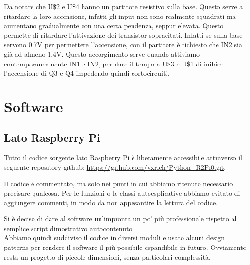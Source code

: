 \documentclass[12pt]{article}
\begin{document}
Da notare che U\$2 e U\$4 hanno un partitore resistivo sulla base. Questo serve a ritardare la loro accensione, infatti gli input non sono realmente squadrati ma aumentano gradualmente con una certa pendenza, seppur elevata. Questo permette di ritardare l'attivazione dei transistor sopracitati. Infatti se sulla base servono 0.7V per permettere l'accensione, con il partitore è richiesto che IN2 sia già ad almeno 1.4V. Questo accorgimento serve quando attiviamo contemporaneamente IN1 e IN2, per dare il tempo a U\$3 e U\$1 di inibire l'accensione di Q3 e Q4 impedendo quindi cortocircuiti.

\section{Software}

\subsection{Lato Raspberry Pi}

Tutto il codice sorgente lato Raspberry Pi è liberamente accessibile attraverso il seguente repository github: \url{https://github.com/vxrich/Python_R2Pi0.git}.

Il codice è commentato, ma solo nei punti in cui abbiamo ritenuto necessario precisare qualcosa. Per le funzioni o le classi autoesplicative abbiamo evitato di aggiungere commenti, in modo da non appesantire la lettura del codice.

Si è deciso di dare al software un'impronta un po' più professionale rispetto al semplice script dimostrativo autocontenuto.\\
Abbiamo quindi suddiviso il codice in diversi moduli e usato alcuni design patterns per rendere il software il più possibile espandibile in futuro. Ovviamente resta un progetto di piccole dimensioni, senza particolari complessità.
\end{document}
